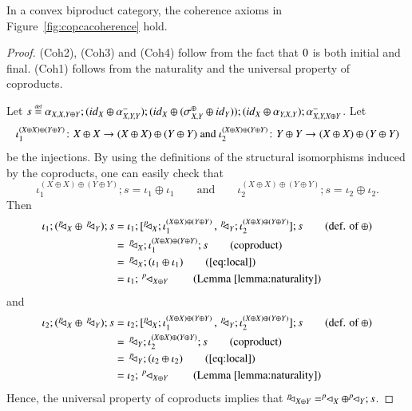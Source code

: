 \begin{lemma}\label{lemma:coherence}
In a convex biproduct category, the coherence axioms in Figure~\ref{fig:copcacoherence} hold.
\end{lemma}
\begin{proof}
(Coh2), (Coh3) and (Coh4) follow from the fact that $0$ is both initial and final. (Coh1) follows from the naturality and the universal property of coproducts. 

Let $s\defeq \assoc{X}{X}{Y\piu Y}; ( {\id{X}\piu \Iassoc{X}{Y}{Y}} ); ({\id X \piu ( \symm{X}{Y}^{\piu} \piu \id Y)} ); (\id{X}\piu \assoc{Y}{X}{Y}); \Iassoc{X}{Y}{X\oplus Y}$. Let
\[\iota_1^{(X\oplus X)\oplus(Y\oplus Y)}\colon X\oplus X \to (X\oplus X)\oplus (Y\oplus Y) \text{ and }\iota_2^{(X\oplus X)\oplus(Y\oplus Y)}\colon Y\oplus Y \to (X\oplus X)\oplus (Y\oplus Y)\] be the injections. By using the definitions of the structural isomorphisms induced by the coproducts, one can easily check that
\begin{equation}\label{eq:local}
\iota_1^{(X\oplus X)\oplus(Y\oplus Y)}; s= \iota_1 \oplus \iota_1 \qquad \text{and} \qquad \iota_2^{(X\oplus X)\oplus(Y\oplus Y)}; s= \iota_2 \oplus \iota_2\text{.}
\end{equation}
Then
\begin{align*}
\iota_1; (\diagp{X}\piu\, \diagp{Y}) ;s &= \iota_1; [\diagp{X}; \iota_1^{(X\oplus X)\oplus(Y\oplus Y)} \, , \, \diagp{Y}; \iota_2^{(X\oplus X)\oplus(Y\oplus Y)}] ;s \tag{def. of $\oplus$}\\
& =\, \diagp{X};\iota_1^{(X\oplus X)\oplus(Y\oplus Y)};s  \tag{coproduct}\\
&=\, \diagp{X}; (\iota_1 \oplus \iota_1) \tag{\ref{eq:local}} \\
&= \iota_1;\,\diagp{X\piu Y} \tag{Lemma \ref{lemma:naturality}}
\end{align*}
and 
\begin{align*}
\iota_2; (\diagp{X}\piu\, \diagp{Y}) ;s &= \iota_2; [\diagp{X}; \iota_1^{(X\oplus X)\oplus(Y\oplus Y)} \, , \, \diagp{Y}; \iota_2^{(X\oplus X)\oplus(Y\oplus Y)}] ;s \tag{def. of $\oplus$}\\
& =\, \diagp{Y};\iota_2^{(X\oplus X)\oplus(Y\oplus Y)};s  \tag{coproduct}\\
&=\, \diagp{Y}; (\iota_2 \oplus \iota_2) \tag{\ref{eq:local}} \\
&= \iota_2;\,\diagp{X\piu Y} \tag{Lemma \ref{lemma:naturality}}
\end{align*}
Hence, the universal property of coproducts implies that $^p\!\! \lhd_{X\oplus Y} = ^p\!\! \lhd_{X}\oplus ^p\!\! \lhd_{Y};s$.
\end{proof}


